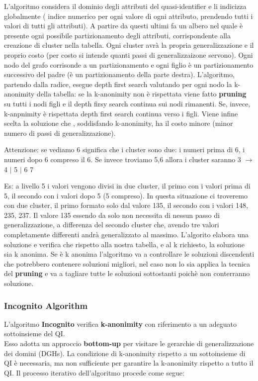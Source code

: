 \documentclass{report}
\begin{document}
\noindent L'algoritmo considera il dominio degli attributi del quasi-identifier e li indicizza globalmente ( indice numerico per ogni valore di ogni attributo, prendendo 
tutti i valori di tutti gli attributi).
A partire da questi ultimi fa un albero nel quale è presente ogni possibile partizionamento degli attributi, corrispondente alla creazione di cluster nella tabella. 
Ogni cluster avrà la propria generalizzazione e il proprio costo (per costo si intende quanti passi di generalizzaizone servono).
Ogni nodo del grafo corrisonde a un partizionamento e ogni figlio è un partizionamento successivo del padre (è un partizionamento della parte destra).
L'algoritmo, partendo dalla radice, esegue depth first search valutando per ogni nodo la k-anonimity della tabella: se la k-anonimity non è rispettata viene fatto \textbf{pruning}
su tutti i nodi figli e il depth firsy search continua sui nodi rimanenti.
Se, invece, k-anpnimity è rispettata depth first search continua verso i figli.
Viene infine scelta la soluzione che , soddisfando k-anonimity, ha il costo minore (minor numero di passi di generalizzazione).

\noindent Attenzione: se vediamo 6 significa che i cluster sono due: i numeri prima di 6, i numeri dopo 6 compreso il 6.
Se invece troviamo 5,6 allora i cluster saranno 3 $ \rightarrow $ 4 $ | $ 5 $ | $ 6 7

\noindent Es: a livello 5 i valori vengono divisi in due cluster, il primo con i valori prima di 5, il secondo con i valori dopo 5 (5 compreso).
In questa situazione ci troveremo con due cluster, il primo formato solo dal valore 135, il secondo con i valori 148, 235, 237.
Il valore 135 essendo da solo non necessita di nessun passo di generalizzazione, a differenza del secondo cluster che, avendo tre valori
completamente differenti andrà generalizzato al massimo.
L'algorito elabora una soluzione e verifica che rispetto alla nostra tabella, e al k richiesto, la soluzione sia k anonima.
Se è k anonima l'algoritmo va a controllare le soluzioni discendenti che potrebbero contenere soluzioni migliori,
nel caso non lo sia applica la tecnica del \textbf{pruning} e va a tagliare tutte le soluzioni sottostanti poichè non conterranno soluzione.


\newpage
\subsubsection{Incognito Algorithm}
L'algoritmo \textbf{Incognito} verifica \textbf{k-anonimity} con riferimento a un adeguato sottoinsieme del QI. \\ 
Esso adotta un approccio \textbf{bottom-up} per visitare le gerarchie di generalizzazione dei domini (DGHs). 
La condizione di k-anonimity rispetto a un sottoinsieme di QI è necessaria, ma non sufficiente per garantire la k-anonimity rispetto a tutto il QI. 
Il processo iterativo dell'algoritmo procede come segue:
\end{document}
